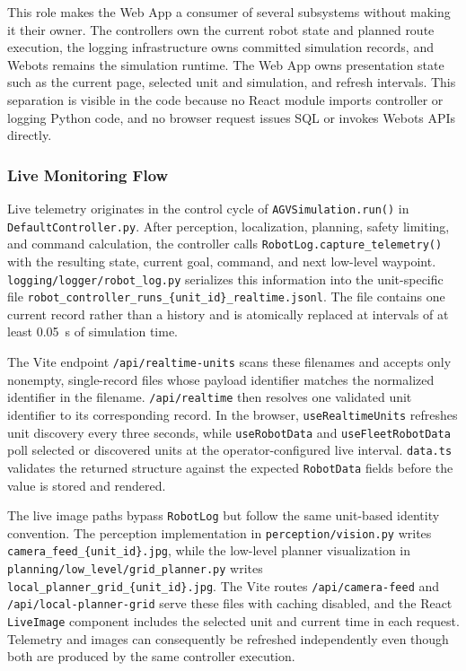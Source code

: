 This role makes the Web App a consumer of several subsystems without making it their owner. The controllers own the current robot state and planned route execution, the logging infrastructure owns committed simulation records, and Webots remains the simulation runtime. The Web App owns presentation state such as the current page, selected unit and simulation, and refresh intervals. This separation is visible in the code because no React module imports controller or logging Python code, and no browser request issues SQL or invokes Webots APIs directly.

\subsubsection{Live Monitoring Flow}

Live telemetry originates in the control cycle of \texttt{AGVSimulation.run()} in \texttt{DefaultController.py}. After perception, localization, planning, safety limiting, and command calculation, the controller calls \texttt{RobotLog.capture\_telemetry()} with the resulting state, current goal, command, and next low-level waypoint. \texttt{logging/logger/robot\_log.py} serializes this information into the unit-specific file \texttt{robot\_controller\_runs\_\{unit\_id\}\_realtime.jsonl}. The file contains one current record rather than a history and is atomically replaced at intervals of at least 0.05~s of simulation time.

The Vite endpoint \texttt{/api/realtime-units} scans these filenames and accepts only nonempty, single-record files whose payload identifier matches the normalized identifier in the filename. \texttt{/api/realtime} then resolves one validated unit identifier to its corresponding record. In the browser, \texttt{useRealtimeUnits} refreshes unit discovery every three seconds, while \texttt{useRobotData} and \texttt{useFleetRobotData} poll selected or discovered units at the operator-configured live interval. \texttt{data.ts} validates the returned structure against the expected \texttt{RobotData} fields before the value is stored and rendered.

The live image paths bypass \texttt{RobotLog} but follow the same unit-based identity convention. The perception implementation in \texttt{perception/vision.py} writes \texttt{camera\_feed\_\{unit\_id\}.jpg}, while the low-level planner visualization in \texttt{planning/low\_level/grid\_planner.py} writes \texttt{local\_planner\_grid\_\{unit\_id\}.jpg}. The Vite routes \texttt{/api/camera-feed} and \texttt{/api/local-planner-grid} serve these files with caching disabled, and the React \texttt{LiveImage} component includes the selected unit and current time in each request. Telemetry and images can consequently be refreshed independently even though both are produced by the same controller execution.

